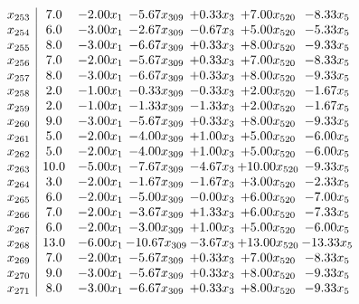 \documentclass[8pt]{article}
\begin{document}
\[\begin{array}{c| c c@{\hskip 2pt} c@{\hskip 2pt} c@{\hskip 2pt} c@{\hskip 2pt} c@{\hskip 2pt} }
 x_{253}   &  7.0 & -2.00 x_{1} & -5.67 x_{309} & +  0.33 x_{3} & +  7.00 x_{520} & -8.33 x_{5}\\
 x_{254}   &  6.0 & -3.00 x_{1} & -2.67 x_{309} & -0.67 x_{3} & +  5.00 x_{520} & -5.33 x_{5}\\
 x_{255}   &  8.0 & -3.00 x_{1} & -6.67 x_{309} & +  0.33 x_{3} & +  8.00 x_{520} & -9.33 x_{5}\\
 x_{256}   &  7.0 & -2.00 x_{1} & -5.67 x_{309} & +  0.33 x_{3} & +  7.00 x_{520} & -8.33 x_{5}\\
 x_{257}   &  8.0 & -3.00 x_{1} & -6.67 x_{309} & +  0.33 x_{3} & +  8.00 x_{520} & -9.33 x_{5}\\
 x_{258}   &  2.0 & -1.00 x_{1} & -0.33 x_{309} & -0.33 x_{3} & +  2.00 x_{520} & -1.67 x_{5}\\
 x_{259}   &  2.0 & -1.00 x_{1} & -1.33 x_{309} & -1.33 x_{3} & +  2.00 x_{520} & -1.67 x_{5}\\
 x_{260}   &  9.0 & -3.00 x_{1} & -5.67 x_{309} & +  0.33 x_{3} & +  8.00 x_{520} & -9.33 x_{5}\\
 x_{261}   &  5.0 & -2.00 x_{1} & -4.00 x_{309} & +  1.00 x_{3} & +  5.00 x_{520} & -6.00 x_{5}\\
 x_{262}   &  5.0 & -2.00 x_{1} & -4.00 x_{309} & +  1.00 x_{3} & +  5.00 x_{520} & -6.00 x_{5}\\
 x_{263}   &  10.0 & -5.00 x_{1} & -7.67 x_{309} & -4.67 x_{3} & + 10.00 x_{520} & -9.33 x_{5}\\
 x_{264}   &  3.0 & -2.00 x_{1} & -1.67 x_{309} & -1.67 x_{3} & +  3.00 x_{520} & -2.33 x_{5}\\
 x_{265}   &  6.0 & -2.00 x_{1} & -5.00 x_{309} & -0.00 x_{3} & +  6.00 x_{520} & -7.00 x_{5}\\
 x_{266}   &  7.0 & -2.00 x_{1} & -3.67 x_{309} & +  1.33 x_{3} & +  6.00 x_{520} & -7.33 x_{5}\\
 x_{267}   &  6.0 & -2.00 x_{1} & -3.00 x_{309} & +  1.00 x_{3} & +  5.00 x_{520} & -6.00 x_{5}\\
 x_{268}   &  13.0 & -6.00 x_{1} & -10.67 x_{309} & -3.67 x_{3} & + 13.00 x_{520} & -13.33 x_{5}\\
 x_{269}   &  7.0 & -2.00 x_{1} & -5.67 x_{309} & +  0.33 x_{3} & +  7.00 x_{520} & -8.33 x_{5}\\
 x_{270}   &  9.0 & -3.00 x_{1} & -5.67 x_{309} & +  0.33 x_{3} & +  8.00 x_{520} & -9.33 x_{5}\\
 x_{271}   &  8.0 & -3.00 x_{1} & -6.67 x_{309} & +  0.33 x_{3} & +  8.00 x_{520} & -9.33 x_{5}\\

\end{array}\]
\end{document}
